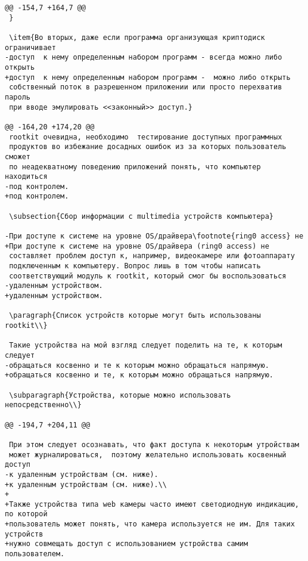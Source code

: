 \begin{verbatim}
@@ -154,7 +164,7 @@
 }

 \item{Во вторых, даже если программа организующая криптодиск ограничивает
-доступ  к нему определенным набором программ - всегда можно либо открыть
+доступ  к нему определенным набором программ -  можно либо открыть
 собственный поток в разрешенном приложении или просто перехватив пароль
 при вводе эмулировать <<законный>> доступ.}

@@ -164,20 +174,20 @@
 rootkit очевидна, необходимо  тестирование доступных программных
 продуктов во избежание досадных ошибок из за которых пользователь сможет
 по неадекватному поведению приложений понять, что компьютер находиться
-под контролем.
+под контролем.

 \subsection{Сбор информации с multimedia устройств компьютера}

-При доступе к системе на уровне OS/драйвера\footnote{ring0 access} не
+При доступе к системе на уровне OS/драйвера (ring0 access) не
 составляет проблем доступ к, например, видеокамере или фотоаппарату
 подключенным к компьютеру. Вопрос лишь в том чтобы написать
 соответствующий модуль к rootkit, который смог бы воспользоваться
-удаленным устройством.
+удаленным устройством.

 \paragraph{Список устройств которые могут быть использованы rootkit\\}

 Такие устройства на мой взгляд следует поделить на те, к которым следует
-обращаться косвенно и те к которым можно обращаться напрямую.
+обращаться косвенно и те, к которым можно обращаться напрямую.

 \subparagraph{Устройства, которые можно использовать непосредственно\\}

@@ -194,7 +204,11 @@

 При этом следует осознавать, что факт доступа к некоторым утройствам
 может журналироваться,  поэтому желательно использовать косвенный доступ
-к удаленным устройствам (см. ниже).
+к удаленным устройствам (см. ниже).\\
+
+Также устройства типа web камеры часто имеют светодиодную индикацию, по которой
+пользователь может понять, что камера используется не им. Для таких устройств
+нужно совмещать доступ с использованием устройства самим пользователем.


\end{verbatim}
